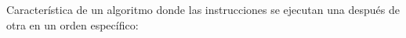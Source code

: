 
\question Característica de un algoritmo donde las instrucciones se
          ejecutan una después de otra en un orden específico:
          \fillin[Ordenado]
